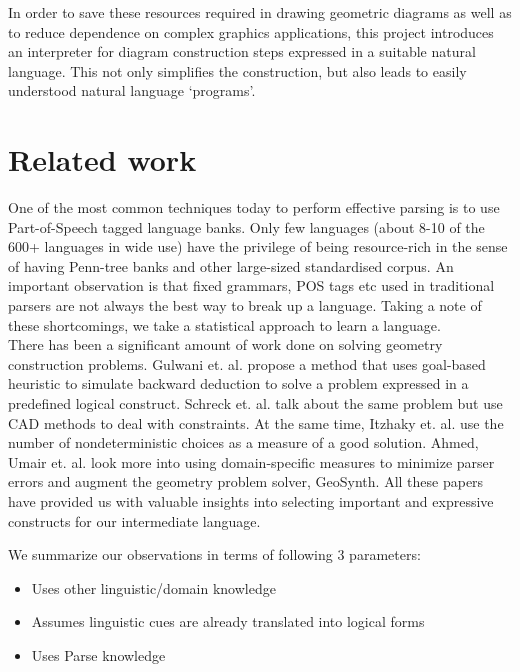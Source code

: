 \def\DevnagVersion{2.15}\documentclass[12pt]{article}
\begin{document}
In order to save these resources required in drawing geometric diagrams as well as to reduce dependence on complex graphics applications, this project introduces an interpreter for diagram construction steps expressed in a suitable natural language. This not only simplifies the construction, but also leads to easily understood natural language `programs'.\\

\section{Related work}
One of the most common techniques today to perform effective parsing is to use Part-of-Speech tagged language banks. Only few languages (about 8-10 of the 600+ languages in wide use) have the privilege of being resource-rich in the sense of having Penn-tree banks and other large-sized standardised corpus. An important observation is that fixed grammars, POS tags etc used in traditional parsers are not always the best way to break up a language. Taking a note of these shortcomings, we take a statistical approach to learn a language.\\

There has been a significant amount of work done on solving geometry construction problems. Gulwani et. al. \cite{gulwani2011synthesizing} propose a method that uses goal-based heuristic to simulate backward deduction to solve a problem expressed in a predefined logical construct. Schreck et. al. \cite{schreck2012geometric} talk about the same problem but use CAD methods to deal with constraints. At the same time, Itzhaky et. al. \cite{itzhaky2012solving} use the number of nondeterministic choices as a measure of a good solution. Ahmed, Umair et. al. \cite{ahmed2012can} look more into using domain-specific measures to minimize parser errors and augment the geometry problem solver, GeoSynth. All these papers have provided us with valuable insights into selecting important and expressive constructs for our intermediate language.

We summarize our observations in terms of following 3 parameters:
\begin{itemize}
\item Uses other linguistic/domain knowledge
\item Assumes linguistic cues are already translated into logical forms
\item Uses Parse knowledge
\end{itemize}
\end{document}
